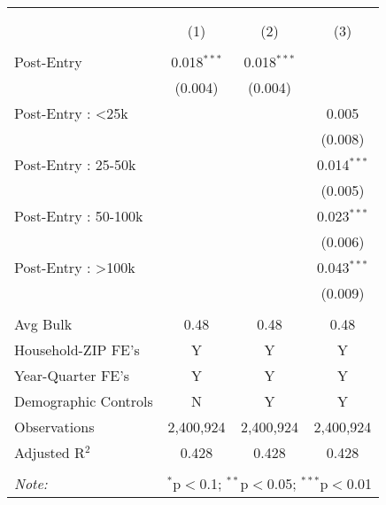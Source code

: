 
\begin{table}[!htbp] \centering 
  \caption{} 
  \label{} 
\begin{tabular}{@{\extracolsep{5pt}}lccc} 
\\[-1.8ex]\hline 
\hline \\[-1.8ex] 
\\[-1.8ex] & (1) & (2) & (3)\\ 
\hline \\[-1.8ex] 
 Post-Entry & 0.018$^{***}$ & 0.018$^{***}$ &  \\ 
  & (0.004) & (0.004) &  \\ 
  Post-Entry : <25k &  &  & 0.005 \\ 
  &  &  & (0.008) \\ 
  Post-Entry : 25-50k &  &  & 0.014$^{***}$ \\ 
  &  &  & (0.005) \\ 
  Post-Entry : 50-100k &  &  & 0.023$^{***}$ \\ 
  &  &  & (0.006) \\ 
  Post-Entry : >100k &  &  & 0.043$^{***}$ \\ 
  &  &  & (0.009) \\ 
 \hline \\[-1.8ex] 
Avg Bulk & 0.48 & 0.48 & 0.48 \\ 
Household-ZIP FE's & Y & Y & Y \\ 
Year-Quarter FE's & Y & Y & Y \\ 
Demographic Controls & N & Y & Y \\ 
Observations & 2,400,924 & 2,400,924 & 2,400,924 \\ 
Adjusted R$^{2}$ & 0.428 & 0.428 & 0.428 \\ 
\hline 
\hline \\[-1.8ex] 
\textit{Note:}  & \multicolumn{3}{l}{$^{*}$p$<$0.1; $^{**}$p$<$0.05; $^{***}$p$<$0.01} \\ 
\end{tabular} 
\end{table} 

